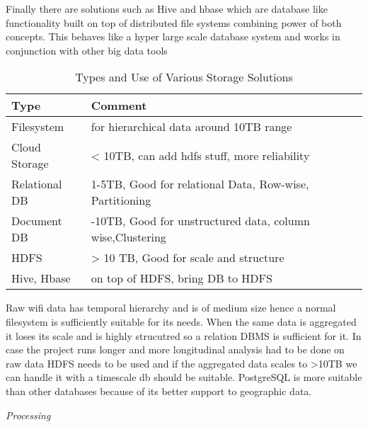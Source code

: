 Finally there are solutions such as Hive and hbase which are database like functionality built on top of distributed file systems combining power of both concepts.
This behaves like a hyper large scale database system and works in conjunction with other big data tools


\begin{table}
    \centering
    \begin{tabular}{|l|l|}
        \hline
        Type & Comment\\
        \hline
        Filesystem & for hierarchical data around 10TB range\\
        Cloud Storage & \textless{}  10TB, can add hdfs stuff, more reliability\\
        Relational DB & 1-5TB, Good for relational Data, Row-wise, Partitioning\\
        Document DB & -10TB, Good for unstructured data, column wise,Clustering\\
        HDFS & \textgreater{} 10 TB, Good for scale and structure\\
        Hive, Hbase & on top of HDFS, bring DB to HDFS\\
        \hline
    \end{tabular}
    \caption{Types and Use of Various Storage Solutions}
    \label{storage_table}
\end{table}


Raw wifi data has temporal hierarchy and is of medium size hence a normal filesystem is sufficiently suitable for its needs.
When the same data is aggregated it loses its scale and is highly strucutred so a relation DBMS is sufficient for it.
In case the project runs longer and more longitudinal analysis had to be done on raw data HDFS needs to be used and if the aggregated data scales to >10TB we can handle it with a timescale db should be suitable.
PostgreSQL is more suitable than other databases because of its better support to geographic data.

\textit{Processing}

